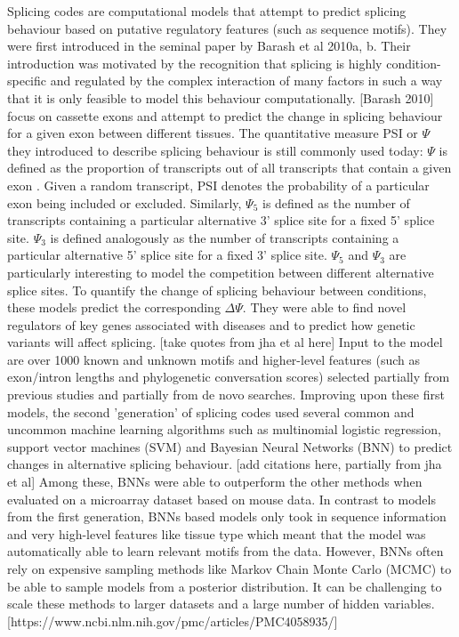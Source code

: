 Splicing codes are computational models that attempt to predict splicing behaviour based on putative regulatory features (such as sequence motifs).
They were first introduced in the seminal paper by Barash et al 2010a, b. Their introduction was motivated by the recognition that splicing is highly condition-specific and regulated by the complex interaction of many factors in such a way that it is only feasible to model this behaviour computationally.
[Barash 2010] focus on cassette exons and attempt to predict the change in splicing behaviour for a given exon between different tissues. The quantitative measure PSI or $\Psi$ they introduced to describe splicing behaviour is still commonly used today:
$\Psi$ is defined as the proportion of transcripts out of all transcripts that contain a given exon \cite{psi}. Given a random transcript, PSI denotes the probability of a particular exon being included or excluded.
Similarly, $\Psi_5$ is defined as the number of transcripts containing a particular alternative 3' splice site for a fixed 5' splice site. $\Psi_3$ is defined analogously as the number of transcripts containing a particular alternative 5' splice site for a fixed 3' splice site. $\Psi_5$ and $\Psi_3$ are particularly interesting to model the competition between different alternative splice sites.
To quantify the change of splicing behaviour between conditions, these models predict the corresponding $\Delta \Psi$. They were able to find novel regulators of key genes associated with diseases and to predict how genetic variants will affect splicing. [take quotes from jha et al here] Input to the model are over 1000 known and unknown motifs and higher-level features (such as exon/intron lengths and phylogenetic conversation scores) selected partially from previous studies and partially from de novo searches.
Improving upon these first models, the second 'generation' of splicing codes used several common and uncommon machine learning algorithms such as multinomial logistic regression, support vector machines (SVM) and Bayesian Neural Networks (BNN) to predict changes in alternative splicing behaviour. [add citations here, partially from jha et al] Among these, BNNs were able to outperform the other methods when evaluated on a microarray dataset based on mouse data. In contrast to models from the first generation, BNNs based models only took in sequence information and very high-level features like tissue type which meant that the model was automatically able to learn relevant motifs from the data.
However, BNNs often rely on expensive sampling methods like Markov Chain Monte Carlo (MCMC) to be able to sample models from a posterior distribution. It can be challenging to scale these methods to larger datasets and a large number of hidden variables. [https://www.ncbi.nlm.nih.gov/pmc/articles/PMC4058935/]
